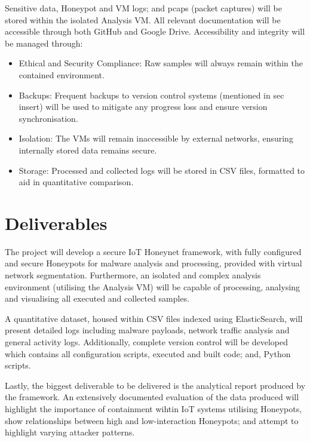 \documentclass[a4paper,12pt,oneside]{book}			%
\begin{document}
Sensitive data, Honeypot and VM logs; and pcaps (packet captures) will be stored within the isolated Analysis VM. All relevant documentation will be accessible through both GitHub and Google Drive. Accessibility and integrity will be managed through:

\begin{itemize}
	\item Ethical and Security Compliance: Raw samples will always remain within the contained environment.
	\item Backups: Frequent backups to version control systems (mentioned in sec insert) will be used to mitigate any progress loss and ensure version synchronisation. 
	\item Isolation: The VMs will remain inaccessible by external networks, ensuring internally stored data remains secure.
	\item Storage: Processed and collected logs will be stored in CSV files, formatted to aid in quantitative comparison.
\end{itemize}


\section{Deliverables}\label{sec: deliverables}

The project will develop a secure IoT Honeynet framework, with fully configured and secure Honeypots for malware analysis and processing, provided with virtual network segmentation. Furthermore, an isolated and complex analysis environment (utilising the Analysis VM) will be capable of processing, analysing and visualising all executed and collected samples.

A quantitative dataset, housed within CSV files indexed using ElasticSearch, will present detailed logs including malware payloads, network traffic analysis and general activity logs. Additionally, complete version control will be developed which contains all configuration scripts, executed and built code; and, Python scripts.

Lastly, the biggest deliverable to be delivered is the analytical report produced by the framework. An extensively documented evaluation of the data produced will highlight the importance of containment wihtin IoT systems utilising Honeypots, show relationships between high and low-interaction Honeypots; and attempt to highlight varying attacker patterns.


\printbibliography
\end{document}
